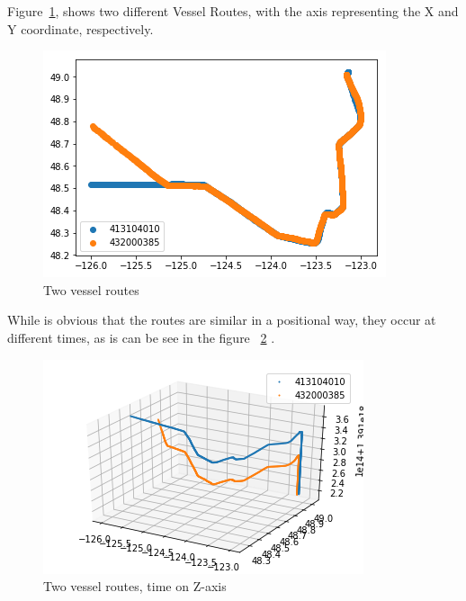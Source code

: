 Figure~\ref{fig: VesselRendevouz2d}, shows two different Vessel Routes, with the axis representing the X and Y coordinate, respectively.

\begin{figure}[H]
	\centering
	\includegraphics[scale = .8]{figures/VesselRendevouz2d}
    \caption{Two vessel routes}
    \label{fig: VesselRendevouz2d}
\end{figure}

While is obvious that the routes are similar in a positional way, they occur at different times, as is can be see in the figure ~\ref{fig: VesselRendevouz3d} .

\begin{figure}[H]
	\centering
	\includegraphics[scale = .9]{figures/VesselRendevouz3d}
    \caption{Two vessel routes, time on Z-axis}
    \label{fig: VesselRendevouz3d}
\end{figure}
